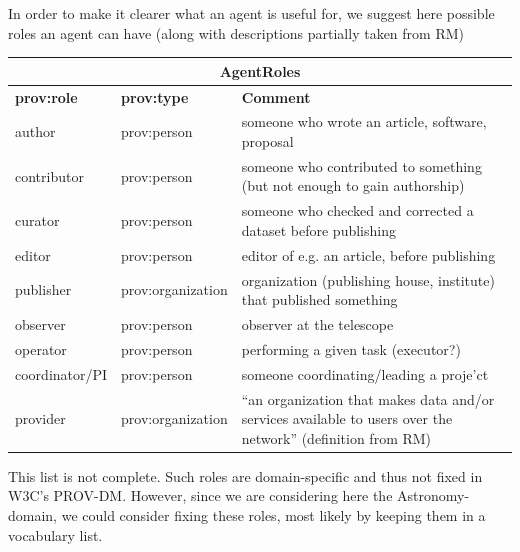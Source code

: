 In order to make it clearer what an agent is useful for, we suggest here possible roles an agent can have (along with descriptions partially taken from RM)\\
\begin{center}
\begin{tabular}{l|l|p{}}
\multicolumn{3}{c}{\textbf{AgentRoles}}\\ \hline
\textbf{prov:role} & \textbf{prov:type} & \textbf{Comment} \\ \hline
author & prov:person & someone who wrote an article, software, proposal\\
contributor & prov:person & someone who contributed to something (but not enough to gain authorship)\\
curator & prov:person & someone who checked and corrected a dataset before publishing\\
editor & prov:person & editor of e.g. an article, before publishing\\
publisher & prov:organization & organization (publishing house, institute) that published something\\
observer & prov:person & observer at the telescope\\
operator & prov:person & performing a given task (executor?)\\
coordinator/PI & prov:person & someone coordinating/leading a proje'ct\\
provider & prov:organization & ``an organization that makes data and/or services available to users over the network'' (definition from RM)
\end{tabular}
\label{tab:agentroles}
\end{center}
This list is not complete. Such roles are domain-specific and thus not fixed in W3C's PROV-DM. However, since we are considering here the Astronomy-domain, we could 
consider fixing these roles, most likely by keeping them in a vocabulary list.





